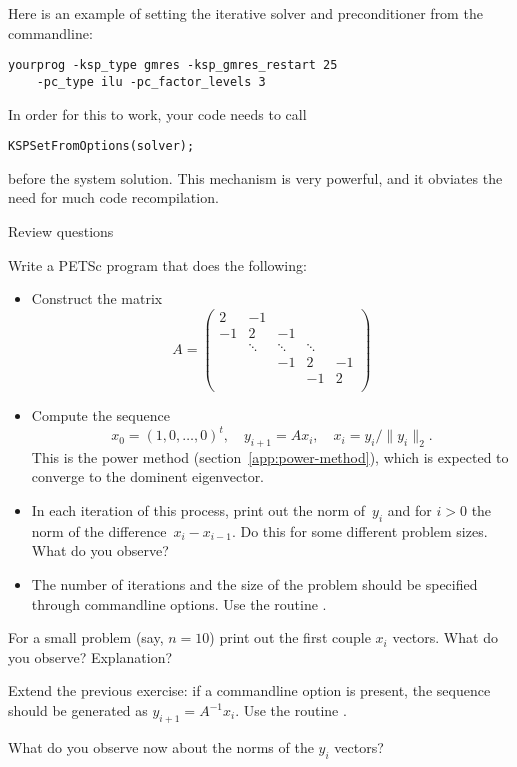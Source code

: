 Here is an example of setting the iterative solver and preconditioner
from the commandline:
\begin{verbatim}
yourprog -ksp_type gmres -ksp_gmres_restart 25
    -pc_type ilu -pc_factor_levels 3
\end{verbatim}

In order for this to work, your code needs to call
\begin{verbatim}
KSPSetFromOptions(solver);
\end{verbatim}
before the system solution. This mechanism is very powerful, and it
obviates the need for much code recompilation.

\begin{istc}
 {Review questions}

\begin{exercise}
Write a PETSc program that does the following:
\begin{itemize}
\item Construct the matrix
  \[
  A=
  \begin{pmatrix}
    2&-1\\ -1&2&-1\\ &\ddots&\ddots&\ddots\\ &&-1&2&-1\\ &&&-1&2\\
  \end{pmatrix}
  \]
\item Compute the sequence
  \[ 
  x_0=(1,0,\ldots,0)^t,\quad y_{i+1}=Ax_i,\quad x_i=y_i/\|y_i\|_2.
  \]
  This is the power method (section~\ref{app:power-method}), which is
  expected to converge to the dominent eigenvector.
\item In each iteration of this process, print out the norm of~$y_i$
  and for $i>0$ the norm of the difference~$x_i-x_{i-1}$. Do this for
  some different problem sizes. What do you observe?
\item The number of iterations and the size of the problem should be
  specified through commandline options. Use the routine
  .
\end{itemize}
For a small problem (say, $n=10$) print out the first couple $x_i$
vectors. What do you observe? Explanation?
\end{exercise}

\end{istc}
\begin{istc}

\begin{exercise}
  Extend the previous exercise: if a commandline option 
  is present, the sequence should be generated as
  $y_{i+1}=A^{-1}x_i$. Use the routine .

  What do you observe now about the norms of the $y_i$ vectors?
\end{exercise}


\end{istc}

